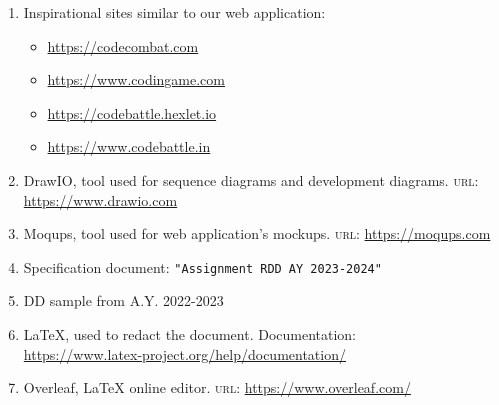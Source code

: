 
\begin{enumerate}
    \item Inspirational sites similar to our web application:
    \begin{itemize}
           \item \url{https://codecombat.com}
           \item \url{https://www.codingame.com}
           \item \url{https://codebattle.hexlet.io}
           \item \url{https://www.codebattle.in}
   \end{itemize}
    \item DrawIO, tool used for sequence diagrams and development diagrams. \textsc{url}: \url{https://www.drawio.com}
    \item Moqups, tool used for web application's mockups. \textsc{url}: \url{https://moqups.com}
    \item Specification document: \texttt{"Assignment RDD AY 2023-2024"}
    \item DD sample from A.Y. 2022-2023
    \item \LaTeX, used to redact the document. Documentation:\\
   \url{https://www.latex-project.org/help/documentation/}
   \item Overleaf, \LaTeX \textbf{ }online editor. \textsc{url}:
   \url{https://www.overleaf.com/}
   
    
\end{enumerate}